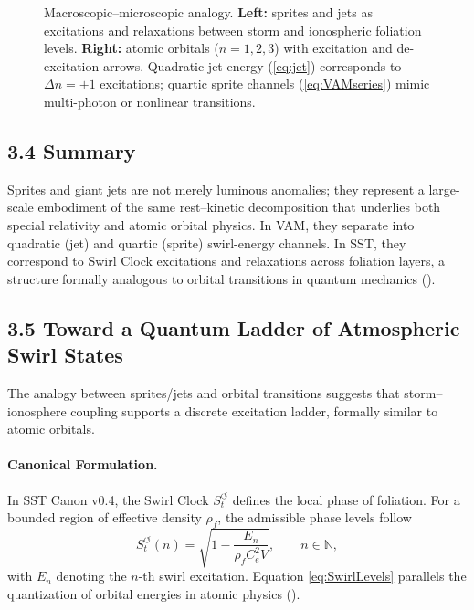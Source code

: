 \documentclass[11pt]{article}
\newcommand{\rhof}{\rho_{\!f}}
\newcommand{\Ce}{C_{e}}
\begin{document}
\begin{figure}[t]
    \caption{Macroscopic--microscopic analogy.
    \textbf{Left:} sprites and jets as excitations and relaxations between storm and ionospheric foliation levels.
    \textbf{Right:} atomic orbitals ($n=1,2,3$) with excitation and de-excitation arrows.
    Quadratic jet energy (\eqref{eq:jet}) corresponds to $\Delta n=+1$ excitations;
    quartic sprite channels (\eqref{eq:VAMseries}) mimic multi-photon or nonlinear transitions.}
    \label{fig:TLEvsOrbitals}
    \end{figure}

\subsection*{3.4 Summary}

    Sprites and giant jets are not merely luminous anomalies; they
    represent a large-scale embodiment of the same rest--kinetic
    decomposition that underlies both special relativity and
    atomic orbital physics.
    In VAM, they separate into quadratic (jet) and quartic (sprite)
    swirl-energy channels.
    In SST, they correspond to Swirl Clock excitations and relaxations
    across foliation layers, a structure formally analogous to orbital
    transitions in quantum mechanics
    (\cite{Bohr1913Hydrogen,Dirac1928Electron,BetheSalpeter1957}).

\subsection*{3.5 Toward a Quantum Ladder of Atmospheric Swirl States}

    The analogy between sprites/jets and orbital transitions suggests that
    storm--ionosphere coupling supports a discrete excitation ladder,
    formally similar to atomic orbitals.

    \paragraph{Canonical Formulation.}
        In SST Canon v0.4, the Swirl Clock $S_t^{\boldsymbol{\circlearrowleft}}$
        defines the local phase of foliation. For a bounded region of effective
        density $\rhof$, the admissible phase levels follow
        \begin{equation}
        S_t^{\boldsymbol{\circlearrowleft}}(n)
        = \sqrt{1 - \frac{E_n}{\rhof \Ce^2 V}},
        \qquad n \in \mathbb{N},
        \label{eq:SwirlLevels}
        \end{equation}
        with $E_n$ denoting the $n$-th swirl excitation.
        Equation \eqref{eq:SwirlLevels} parallels the quantization
        of orbital energies in atomic physics
        (\cite{Bohr1913Hydrogen,Dirac1928Electron,BetheSalpeter1957}).
\end{document}
